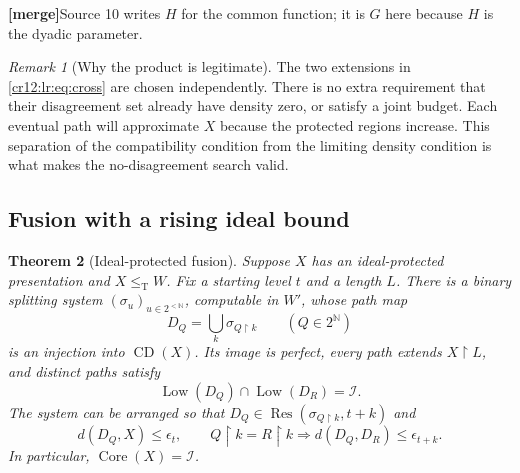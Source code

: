 \documentclass[11pt,letterpaper]{article}
\theoremstyle{plain}
\newtheorem{theorem}{Theorem}[section]
\theoremstyle{definition}
\theoremstyle{remark}
\newtheorem{remark}[theorem]{Remark}
\numberwithin{equation}{section}
\newcommand{\N}{\mathbb N}
\newcommand{\Cantor}{2^{\N}}
\newcommand{\leT}{\leq_{\mathrm T}}
\newcommand{\Core}{\operatorname{Core}}
\newcommand{\CD}{\operatorname{CD}}
\newcommand{\Low}{\operatorname{Low}}
\newcommand{\rest}{\mathbin{\upharpoonright}}
\newcommand{\I}{\mathcal I}
\newcommand{\mergenote}[1]{\par\smallskip\noindent
 {\small\textsf{\textbf{[merge]}}\enspace #1}\par\smallskip}
\newcommand{\Res}{\operatorname{Res}}
\begin{document}
\mergenote{Source 10 writes $H$ for the common function; it is $G$ here because $H$ is
the dyadic parameter.}

\begin{remark}[Why the product is legitimate]
The two extensions in \eqref{cr12:lr:eq:cross} are chosen independently. There is no
extra requirement that their disagreement set already have density zero, or satisfy a
joint budget. Each eventual path will approximate $X$ because the protected regions
increase. This separation of the compatibility condition from the limiting density
condition is what makes the no-disagreement search valid.
\end{remark}

\subsection{Fusion with a rising ideal bound}
\begin{theorem}[Ideal-protected fusion]\label{cr12:lr:thm:fusion}
Suppose $X$ has an ideal-protected presentation and $X\leT W$. Fix a starting level
$t$ and a length $L$. There is a binary splitting system $(\sigma_u)_{u\in2^{<\N}}$,
computable in $W'$, whose path map
\[
 D_Q=\bigcup_k\sigma_{Q\rest k}\qquad(Q\in\Cantor)
\]
is an injection into $\CD(X)$. Its image is perfect, every path extends $X\rest L$,
and distinct paths satisfy
\begin{equation}\label{cr12:lr:eq:exactpair}
 \Low(D_Q)\cap\Low(D_R)=\I.
\end{equation}
The system can be arranged so that $D_Q\in\Res(\sigma_{Q\rest k},t+k)$ and
\begin{equation}\label{cr12:lr:eq:fusionmetric}
 d(D_Q,X)\leq\epsilon_t,\qquad
 Q\rest k=R\rest k\Longrightarrow d(D_Q,D_R)\leq\epsilon_{t+k}.
\end{equation}
In particular, $\Core(X)=\I$.
\end{theorem}
\end{document}

